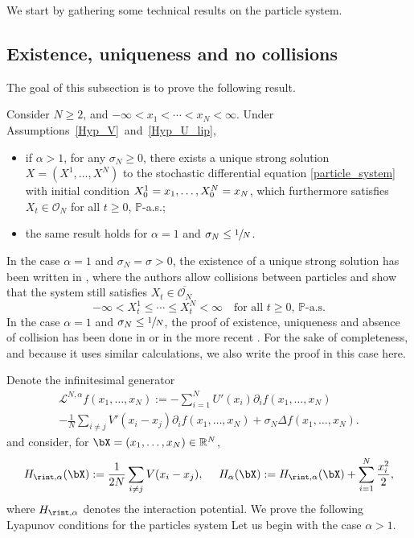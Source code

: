 We start by gathering some technical results on the particle system.

\subsection{Existence, uniqueness and no collisions}\label{sec_exist}

The goal of this subsection is to prove the following result.

\begin{theorem}\label{exist_unique}
Consider $N\geq 2$, and $-\infty<x_1<\cdots<x_N<\infty$. Under Assumptions~\ref{Hyp_V}~and~\ref{Hyp_U_lip},
\begin{itemize}
\item if $\alpha>1$, for any $\sigma_N\geq0$, there exists a unique strong solution $X=(X^1,\dots,X^N)$ to the stochastic differential equation \eqref{particle_system} with initial condition $X^1_0=x_1,\dots,\allowbreak X^N_0=\nobreak x_N$, which furthermore satisfies $X_t\in\mathcal{O}_N$ for all $t\geq0$, $\mathbb{P}$-a.s.;
\item the same result holds for $\alpha=1$ and $\sigma_N\leq\sfrac{1}{N}$.
\end{itemize}
\end{theorem}

\begin{remark}
In the case $\alpha=1$ and $\sigma_N=\sigma>0$, the existence of a unique strong solution has been written in \cite[Th.\,2.5]{cepa_lepingle}, where the authors allow collisions between particles and show that the system still satisfies $X_t\in\overline{\mathcal{O}_N}$ \ie
\[
-\infty<X^1_t\leq\cdots\leq X^N_t<\infty\quad\text{for all }t\geq0,\, \mathbb{P}\text{-a.s.}
\]
In the case $\alpha=1$ and $\sigma_N\leq\sfrac{1}{N}$, the proof of existence, uniqueness and absence of collision has been done in \cite{Rogers_Shi} or in the more recent \cite{Li_Li_Xie}. For the sake of completeness, and because it uses similar calculations, we also write the proof in this case here.
\end{remark}

Denote the infinitesimal generator
\begin{multline*}
\mathcal{L}^{N,\alpha}f(x_1,\dots,x_N):=-\sum_{i=1}^NU'(x_i)\partial_if(x_1,\dots,x_N)\\[-3pt]
-\frac{1}{N}\sum_{i\neq j}V'(x_i-x_j)\partial_if(x_1,\dots,x_N)+\sigma_N\Delta f(x_1,\dots,x_N).
\end{multline*}
and consider, for $\bX=(x_1,\dots,x_N)\in\mathbb{R}^N$,
\begin{align*}
H_{\rint, \alpha}(\bX):=\frac{1}{2N}\sum_{i\neq j}V(x_i-x_j),\quad \ H_{\alpha}(\bX):=H_{\rint, \alpha}(\bX)+\sum_{i=1}^N \frac{x^2_i}{2},
\end{align*}
where $H_{\rint,\alpha}$ denotes the interaction potential. We prove the following Lyapunov conditions for the particles system Let us begin with the case $\alpha>1$.


